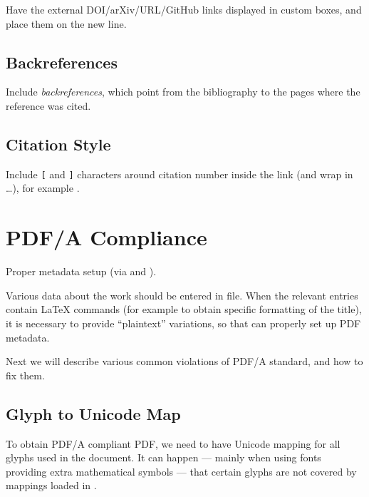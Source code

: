 Have the external \textsf{DOI/arXiv/URL/GitHub} links displayed in custom boxes, and place them on the new line.

\subsection{Backreferences}%
\label{sub:Backreferences}

Include \emph{backreferences}, which point from the bibliography to the pages where the reference was cited.

\subsection{Citation Style}%
\label{sub:Citation Style}

Include \texttt{[} and \texttt{]} characters around citation number inside the link (and wrap in  \ldots), for example \autocite{TeXtured}.


\section{PDF/A Compliance}%
\label{sec:PDF/A Compliance}

Proper metadata setup (via  and \macro{\DocumentMetadata}).
\begin{remark}
    Various data about the work should be entered in  file.
    When the relevant entries contain \LaTeX{} commands (for example to obtain specific formatting of the title), it is necessary to provide \enquote{plaintext} variations, so that  can properly set up PDF metadata.
\end{remark}

Next we will describe various common violations of PDF/A standard, and how to fix them.

\subsection{Glyph to Unicode Map}%
\label{sub:Glyph to Unicode Map}

To obtain PDF/A compliant PDF, we need to have Unicode mapping for all glyphs used in the document.
It can happen --- mainly when using fonts providing extra mathematical symbols --- that certain glyphs are not covered by mappings loaded in .

